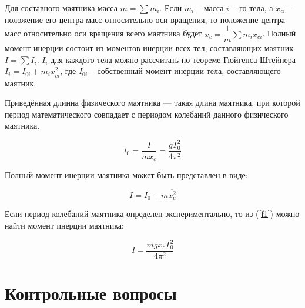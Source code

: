 \documentclass[12pt,a4paper]{article}%
\begin{document}
Для составного маятника масса 
$ m = \sum{m_{i}} $. Если $m_{i}$ -- масса $i-$го тела, а $x_{ci}$ -- положение его центра масс относительно оси вращения, то положение центра масс относительно оси вращения всего маятника будет $x_{c} = \dfrac{1}{m}\sum{m_{i}x_{ci}}$. Полный момент инерции состоит из моментов инерции всех тел, составляющих маятник $I = \sum{I_{i}}$. $I_{i}$ для каждого тела можно рассчитать по теореме Гюйгенса-Штейнера $I_{i} = I_{0i} + m_{i} x_{ci}^2$, где $I_{0i}$ -- собственный момент инерции тела, составляющего маятник.

Приведённая длинна физического маятника --- такая длина маятника, при которой период математического совпадает с периодом колебаний данного
физического маятника. 

\begin{equation}
l_0 = \dfrac{I}{mx_c} = \dfrac{gT_0^2}{4\pi^2}
\end{equation}

Полный момент инерции маятника может быть представлен в виде:


\begin{equation}
I = I_0 + m \overline{x_c^2}
\end{equation}

Если период колебаний маятника определен экспериментально, то из
(\ref{f1}) можно найти момент инерции маятника:

\begin{equation}
I = \dfrac{mgx_cT_0^2}{4\pi^2}
\end{equation}

\newpage

\section*{Контрольные вопросы}
\end{document}
